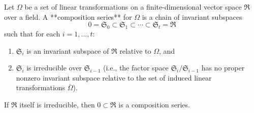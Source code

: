 Let $\Omega$ be a set of linear transformations on a finite-dimensional vector space $\mathfrak{R}$ over a field. A **composition series** for $\Omega$ is a chain of invariant subspaces
$$0 = \mathfrak{S}_0 \subset \mathfrak{S}_1 \subset \cdots \subset \mathfrak{S}_t = \mathfrak{R}$$
such that for each $i = 1, \dots, t$:
\begin{enumerate}
\item $\mathfrak{S}_i$ is an invariant subspace of $\mathfrak{R}$ relative to $\Omega$, and
\item $\mathfrak{S}_i$ is irreducible over $\mathfrak{S}_{i-1}$ (i.e., the factor space $\mathfrak{S}_i/\mathfrak{S}_{i-1}$ has no proper nonzero invariant subspace relative to the set of induced linear transformations $\bar{\Omega}$).
\end{enumerate}

If $\mathfrak{R}$ itself is irreducible, then $0 \subset \mathfrak{R}$ is a composition series.
